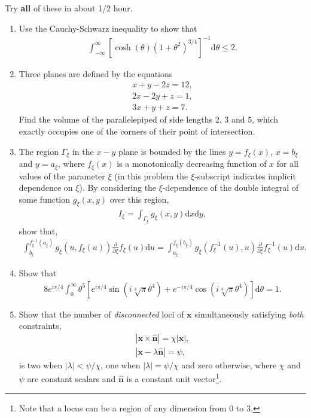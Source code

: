 \documentclass[10pt]{iopart}
\begin{document}
Try \textbf{all} of these in about 1/2 hour.
\begin{enumerate}[label=A\arabic*)]
\item	Use the Cauchy-Schwarz inequality to show that
\begin{eqnarray}
\int_{-\infty}^{\infty}\left[\cosh(\theta)\left(1+\theta^2\right)^{3/4}\right]^{-1}\mathrm{d}\theta\leq 2.
\end{eqnarray}
\item	Three planes are defined by the equations
\begin{eqnarray}
x+y-2z=12,\\
2x-2y+z=1, \\
3x+y+z=7.
\end{eqnarray}  
Find the volume of the parallelepiped of side lengths $2$, $3$ and $5$, which exactly occupies one of the corners of their point of intersection.
\item	The region $\Gamma_\xi$ in the $x-y$ plane is bounded by the lines $y=f_\xi(x)$, $x=b_\xi$ and $y=a_\xi$, where $f_\xi(x)$ is a monotonically decreasing function of $x$ for all values of the parameter $\xi$ (in this problem the $\xi$-subscript indicates implicit dependence on $\xi$). By considering the $\xi$-dependence of the double integral of some function $g_\xi(x,y)$ over this region,
\begin{eqnarray}
I_\xi=\int_{\Gamma_\xi}g_\xi(x,y)\mathrm{d}x\mathrm{d}y,
\end{eqnarray}
show that,
\begin{eqnarray}
\int_{b_\xi}^{f^{-1}_\xi(a_\xi)}g_\xi(u,f_\xi(u))\frac{\partial}{\partial\xi}f_\xi(u)\mathrm{d}u=\int_{a_\xi}^{f_\xi(b_\xi)}g_\xi(f^{-1}_\xi(u),u)\frac{\partial}{\partial\xi}f^{-1}_\xi(u)\mathrm{d}u.
\end{eqnarray}
\item	Show that
\begin{eqnarray}
8e^{i\pi/4}\int_{0}^{\infty}\theta^5\left[e^{i\pi/4}\sin\left(i\sqrt[3]{\pi}\theta^4\right)+e^{-i\pi/4}\cos\left(i\sqrt[3]{\pi}\theta^4\right)\right]\mathrm{d}\theta=1.
\end{eqnarray}
\item	Show that the number of \textit{disconnected} loci of $\mathbf{x}$ simultaneously satisfying \textit{both} constraints,
\begin{eqnarray}
|\mathbf{x}\times\hat{\mathbf{n}}|=\chi|\mathbf{x}|,\\ |\mathbf{x}-\lambda\hat{\mathbf{n}}|=\psi,
\end{eqnarray}
is two when $|\lambda|<\psi/\chi$, one when $|\lambda|=\psi/\chi$ and zero otherwise, where $\chi$ and $\psi$ are constant scalars and $\hat{\mathbf{n}}$ is a constant unit vector\footnote{Note that a locus can be a region of any dimension from $0$ to $3$.}.

\end{enumerate}
\end{document}
